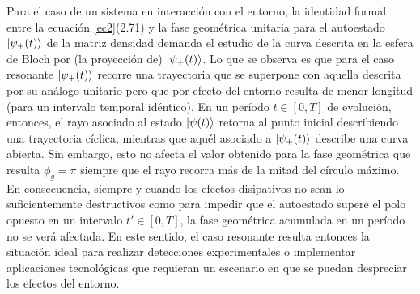 Para el caso de un sistema en interacción con el entorno, la identidad formal entre la ecuación \ref{ec2}(2.71) y la fase geométrica unitaria para el autoestado $\ket{\psi_+(t)}$ de la matriz densidad demanda el estudio de la curva descrita en la esfera de Bloch por (la proyección de) $\ket{\psi_+(t)}$. Lo que se observa es que para el caso resonante $\ket{\psi_+(t)}$ recorre una trayectoria que se superpone con aquella descrita por su análogo unitario pero que por efecto del entorno resulta de menor longitud (para un intervalo temporal idéntico). En un período $t \in [0, T]$ de evolución, entonces, el rayo asociado al estado $\ket{\psi(t)}$ retorna al punto inicial describiendo una trayectoria cíclica, mientras que aquél asociado a $\ket{\psi_+(t)}$ describe una curva abierta. Sin embargo, esto no afecta el valor obtenido para la fase geométrica que resulta $\phi_g=\pi$ siempre que el rayo recorra más de la mitad del círculo máximo. En consecuencia, siempre y cuando los efectos disipativos no sean lo suficientemente destructivos como para impedir que el autoestado supere el polo opuesto en un intervalo $t' \in [0, T]$, la fase geométrica acumulada en un período no se verá afectada. En este sentido, el caso resonante resulta entonces la situación ideal para realizar detecciones experimentales o implementar aplicaciones tecnológicas que requieran un escenario en que se puedan despreciar los efectos del entorno.